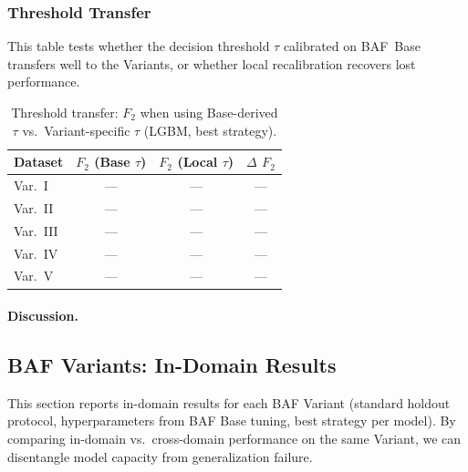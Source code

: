 \subsubsection{Threshold Transfer}

This table tests whether the decision threshold $\tau$ calibrated on
BAF~Base transfers well to the Variants, or whether local recalibration
recovers lost performance.

\begin{table}[ht]
\centering
\caption{Threshold transfer: $F_2$ when using Base-derived $\tau$ vs.\
  Variant-specific $\tau$ (LGBM, best strategy).}
\label{tab:crossdomain_threshold}
\begin{tabular}{l c c c}
\toprule
Dataset & $F_2$ (Base $\tau$) & $F_2$ (Local $\tau$) & $\Delta$ $F_2$ \\
\midrule
Var.~I   & --- & --- & --- \\
Var.~II  & --- & --- & --- \\
Var.~III & --- & --- & --- \\
Var.~IV  & --- & --- & --- \\
Var.~V   & --- & --- & --- \\
\bottomrule
\end{tabular}
\end{table}

\paragraph{Discussion.}



\subsection{BAF Variants: In-Domain Results}
\label{sec:baf_variants}

This section reports in-domain results for each BAF Variant
(standard holdout protocol, hyperparameters from BAF Base tuning,
best strategy per model).
By comparing in-domain vs.\ cross-domain performance on the same Variant,
we can disentangle model capacity from generalization failure.

